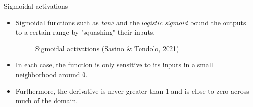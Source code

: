 \begin{frame} {Sigmoidal activations}
  \begin{itemize}
    \item Sigmoidal functions such as \emph{tanh} and the \emph{logistic sigmoid} bound the outputs to a certain range by "squashing" their inputs.
    \begin{figure}
    \centering
      \caption{Sigmoidal activations (Savino \& Tondolo, 2021)}
    \end{figure}
    \item In each case, the function is only sensitive to its inputs in a small neighborhood around $0$.
    \item Furthermore, the derivative is never greater than 1 and is close to zero across much of the domain.
  \end{itemize}
\end{frame}

